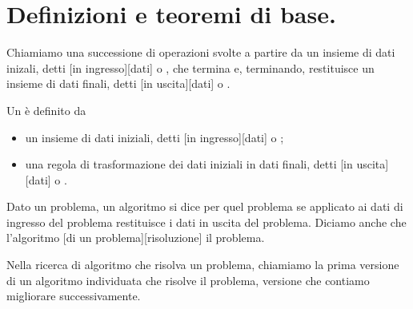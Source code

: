 \section{Definizioni e teoremi di base.}
\label{AlgoritmiEStruttureDiDati_DefinizioniETeoremiDiBase}
\begin{Definition}
	Chiamiamo  una successione di operazioni svolte a partire da un insieme di dati inizali, detti [in ingresso][dati] o , che termina e, terminando, restituisce un insieme di dati finali, detti [in uscita][dati] o .
\end{Definition}
\begin{Definition}
	Un  \`e definito da
	\begin{itemize}
		\item un insieme di dati iniziali, detti [in ingresso][dati] o ;
		\item una regola di trasformazione dei dati iniziali in dati finali, detti [in uscita][dati] o .
	\end{itemize}
\end{Definition}
\begin{Definition}
	Dato un problema, un algoritmo si dice  per quel problema se applicato ai dati di ingresso del problema restituisce i dati in uscita del problema. Diciamo anche che l'algoritmo [di un problema][risoluzione] il problema.
\end{Definition}
\begin{Definition}
	Nella ricerca di algoritmo che risolva un problema, chiamiamo  la prima versione di un algoritmo individuata che risolve il problema, versione che contiamo migliorare successivamente.
\end{Definition}
